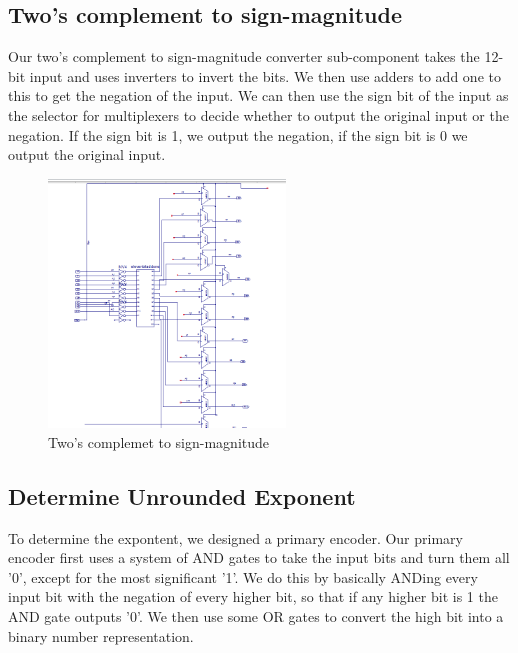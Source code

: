 \documentclass[paper=letter, fontsize=11pt]{scrartcl}
\begin{document}
\pagebreak

\subsection{Two's complement to sign-magnitude}
Our two's complement to sign-magnitude converter sub-component takes the 12-bit input and uses inverters to invert the bits. We then use adders to add one to this to get the negation of the input. We can then use the sign bit of the input as the selector for multiplexers to decide whether to output the original input or the negation. If the sign bit is 1, we output the negation, if the sign bit is 0 we output the original input.
\begin{figure}[H]
\includegraphics[height=66mm]{signmag.png}
\centering
\caption{Two's complemet to sign-magnitude}
\label{overflow}
\end{figure}

\pagebreak

\subsection{Determine Unrounded Exponent}
To determine the expontent, we designed a primary encoder. Our primary encoder first uses a system of AND gates to take the input bits and turn them all '0', except for the most significant '1'. We do this by basically ANDing every input bit with the negation of every higher bit, so that if any higher bit is 1 the AND gate outputs '0'. We then use some OR gates to convert the high bit into a binary number representation. 
\end{document}
